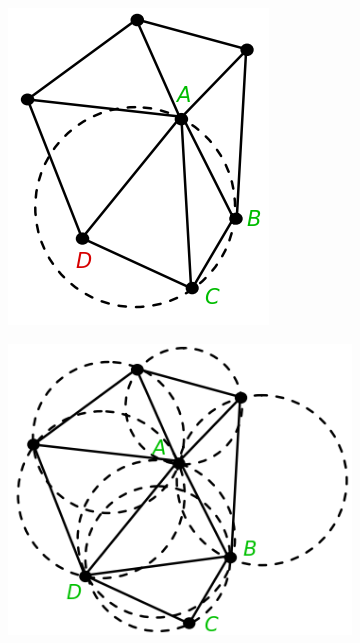 \begin{figure}[H]
    \centering
    \caption{(a) Triangulação que não satisfaz o critério de Delaunay; (b) Triangulação de Delaunay.}
    \begin{subfigure}[t]{0.2\textwidth}
        \includegraphics[width=\textwidth]{dados/figuras/delaunay1.png}
        \caption{}
        \label{fig:delaunay1}
    \end{subfigure}
    \hspace{3em}
    \begin{subfigure}[t]{0.3\textwidth}
        \includegraphics[width=\textwidth]{dados/figuras/delaunay2.png}

\end{subfigure}
\end{figure}
